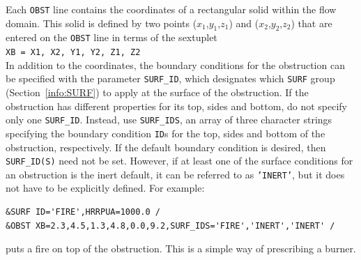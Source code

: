 \documentclass[11pt]{book}
\newcommand{\ct}{\tt\small}
\begin{document}
Each {\ct OBST} line contains the coordinates of a rectangular
solid within the flow domain. This solid is defined by two points
($x_1$,$y_1$,$z_1$) and ($x_2$,$y_2$,$z_2$) that are entered on the
{\ct OBST} line in terms of the sextuplet \\
{\ct XB = X1, X2, Y1, Y2, Z1, Z2} \\
In addition to the coordinates, the boundary conditions for the obstruction
can be specified with the parameter {\ct SURF\_ID}, which designates which
{\ct SURF} group (Section~\ref{info:SURF}) to apply at the surface of the obstruction.
If the obstruction has different properties for its top,
sides and bottom, do not specify only one {\ct SURF\_ID}. Instead, use {\ct SURF\_IDS}, an array of three character
strings specifying the boundary condition {\ct ID}s for the top,
sides and bottom of the obstruction, respectively.
If the default
boundary condition is desired, then {\ct SURF\_ID(S)} need not be set.
However, if at least one of the surface conditions for an
obstruction is the inert default, it can be referred to as {\ct 'INERT'}, but it does not have to be explicitly defined.
For example:

\footnotesize
\begin{verbatim}
&SURF ID='FIRE',HRRPUA=1000.0 /
&OBST XB=2.3,4.5,1.3,4.8,0.0,9.2,SURF_IDS='FIRE','INERT','INERT' /
\end{verbatim}
\normalsize

\noindent
puts a fire on top of the obstruction. This is a simple way of
prescribing a burner.
\end{document}
